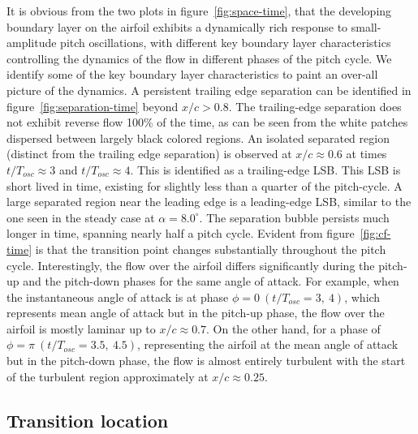 It is obvious from the two plots in figure~\ref{fig:space-time}, that the developing boundary layer on the airfoil exhibits a dynamically rich response to small-amplitude pitch oscillations, with different key boundary layer characteristics controlling the dynamics of the flow in different phases of the pitch cycle. We identify some of the key boundary layer characteristics to paint an over-all picture of the dynamics. A persistent trailing edge separation can be identified in figure~\ref{fig:separation-time} beyond $x/c>0.8$. The trailing-edge separation does not exhibit reverse flow 100\% of the time, as can be seen from the white patches dispersed between largely black colored regions. An isolated separated region (distinct from the trailing edge separation) is observed at $x/c\approx0.6$ at times $t/T_{osc}\approx3$ and $t/T_{osc}\approx4$. This is identified as a trailing-edge LSB. This LSB is short lived in time, existing for slightly less than a quarter of the pitch-cycle. A large separated region near the leading edge is a leading-edge LSB, similar to the one seen in the steady case at $\alpha=8.0^{\circ}$. The separation bubble persists much longer in time, spanning nearly half a pitch cycle. Evident from figure~\ref{fig:cf-time} is that the transition point changes substantially throughout the pitch cycle. Interestingly, the flow over the airfoil differs significantly during the pitch-up and the pitch-down phases for the same angle of attack. For example, when the instantaneous angle of attack is at phase $\phi=0\ (t/T_{osc}=3,\ 4)$, which represents mean angle of attack but in the pitch-up phase, the flow over the airfoil is mostly laminar up to $x/c\approx0.7$. On the other hand, for a phase of $\phi=\pi\ (t/T_{osc}=3.5,\ 4.5)$, representing the airfoil at the mean angle of attack but in the pitch-down phase, the flow is almost entirely turbulent with the start of the turbulent region approximately at $x/c\approx0.25$.

\subsection{Transition location}

